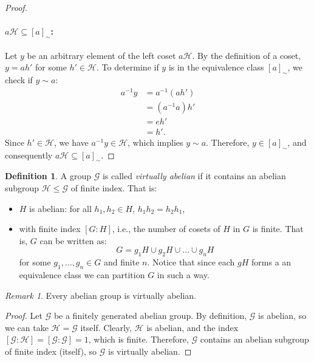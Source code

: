 \documentclass{pracalicmgr2025}
\theoremstyle{plain}            %
\theoremstyle{remark}           %
\newtheorem{remark}[theorem]{Remark}
\theoremstyle{definition}       %
\newtheorem{definition}[theorem]{Definition}
\begin{document}
\begin{proof}
\vspace{1em}

\paragraph{$a\mathcal{H} \subseteq [a]_\sim$:}

Let $y$ be an arbitrary element of the left coset $a\mathcal{H}$. By the definition of a coset, $y = ah'$ for some $h' \in \mathcal{H}$.
To determine if $y$ is in the equivalence class $[a]_\sim$, we check if $y \sim a$:
\begin{align*}
    a^{-1}y &= a^{-1}(ah') \\
            &= (a^{-1}a)h' \\
            &= e h' \\
            &= h'.
\end{align*}
Since $h' \in \mathcal{H}$, we have $a^{-1}y \in \mathcal{H}$, which implies $y \sim a$.
Therefore, $y \in [a]_\sim$, and consequently $a\mathcal{H} \subseteq [a]_\sim$.


\end{proof}

\begin{definition}
    A group $\mathcal{G}$ is called \emph{virtually abelian} if it contains an abelian subgroup $\mathcal{H} \leq \mathcal{G}$ of finite index. That is:
    \begin{itemize}
        \item $H$ is abelian: for all $h_1, h_2 \in H$, $h_1 h_2 = h_2 h_1$,
        \item with finite index $[G : H]$, i.e., the number of cosets of $H$ in $G$ is finite. That is, $G$ can be written as:
        \[
        G = g_1 H \cup g_2 H \cup \dots \cup g_n H
        \]
        for some $g_1, \dots, g_n \in G$ and finite $n$. Notice that since each $gH$ forms a an equivalence class we can partition $G$ in such a way. 
    \end{itemize}
\end{definition}

\begin{remark}
    Every abelian group is virtually abelian.
\end{remark}
\begin{proof}
Let $\mathcal{G}$ be a finitely generated abelian group. By definition, $\mathcal{G}$ is abelian, so we can take $\mathcal{H} = \mathcal{G}$ itself. Clearly, $\mathcal{H}$ is abelian, and the index $[\mathcal{G} : \mathcal{H}] = [\mathcal{G} : \mathcal{G}] = 1$, which is finite. Therefore, $\mathcal{G}$ contains an abelian subgroup of finite index (itself), so $\mathcal{G}$ is virtually abelian.
\end{proof}
\end{document}
